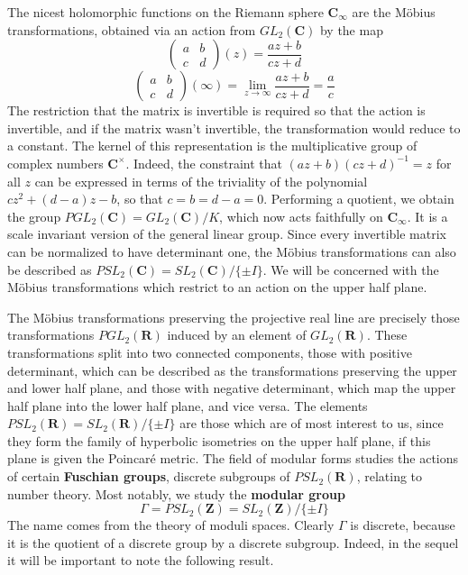 The nicest holomorphic functions on the Riemann sphere $\mathbf{C}_\infty$ are the M\"{o}bius transformations, obtained via an action from $GL_2(\mathbf{C})$ by the map
%
\[ \begin{pmatrix} a & b \\ c & d \end{pmatrix}(z)  = \frac{az + b}{cz + d} \]
%
\[ \begin{pmatrix} a & b \\ c & d \end{pmatrix}(\infty) = \lim_{z \to \infty } \frac{az + b}{cz + d} = \frac{a}{c} \]
%
The restriction that the matrix is invertible is required so that the action is invertible, and if the matrix wasn't invertible, the transformation would reduce to a constant. The kernel of this representation is the multiplicative group of complex numbers $\mathbf{C}^\times$. Indeed, the constraint that $(az + b)(cz + d)^{-1} = z$ for all $z$ can be expressed in terms of the triviality of the polynomial $cz^2 + (d-a)z - b$, so that $c = b = d-a = 0$. Performing a quotient, we obtain the group $PGL_2(\mathbf{C}) = GL_2(\mathbf{C})/K$, which now acts faithfully on $\mathbf{C}_\infty$. It is a scale invariant version of the general linear group. Since every invertible matrix can be normalized to have determinant one, the M\"{o}bius transformations can also be described as $PSL_2(\mathbf{C}) = SL_2(\mathbf{C})/\{ \pm I \}$. We will be concerned with the M\"{o}bius transformations which restrict to an action on the upper half plane.

The M\"{o}bius transformations preserving the projective real line are precisely those transformations $PGL_2(\mathbf{R})$ induced by an element of $GL_2(\mathbf{R})$. These transformations split into two connected components, those with positive determinant, which can be described as the transformations preserving the upper and lower half plane, and those with negative determinant, which map the upper half plane into the lower half plane, and vice versa. The elements $PSL_2(\mathbf{R}) = SL_2(\mathbf{R})/\{ \pm I \}$ are those which are of most interest to us, since they form the family of hyperbolic isometries on the upper half plane, if this plane is given the Poincar\'{e} metric. The field of modular forms studies the actions of certain {\bf Fuschian groups}, discrete subgroups of $PSL_2(\mathbf{R})$, relating to number theory. Most notably, we study the {\bf modular group}
%
\[ \Gamma = PSL_2(\mathbf{Z}) = SL_2(\mathbf{Z})/\{ \pm I \} \]
%
The name comes from the theory of moduli spaces. Clearly $\Gamma$ is discrete, because it is the quotient of a discrete group by a discrete subgroup. Indeed, in the sequel it will be important to note the following result.

